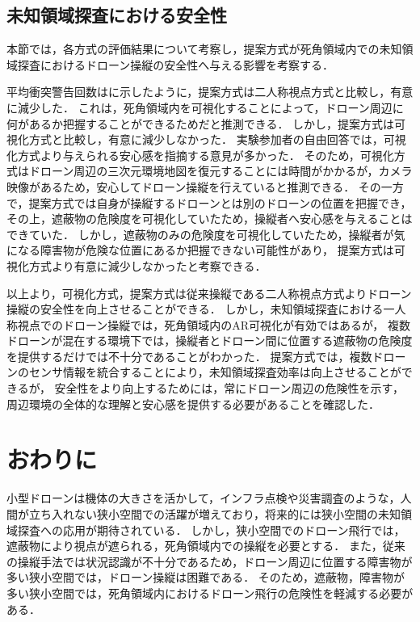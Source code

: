 \documentclass[a4paper,11pt]{ujreport}
\begin{document}
\section{未知領域探査における安全性}
\label{sec:Safety}

本節では，各方式の評価結果について考察し，提案方式が死角領域内での未知領域探査におけるドローン操縦の安全性へ与える影響を考察する．
\par
平均衝突警告回数はに示したように，提案方式は二人称視点方式と比較し，有意に減少した．
これは，死角領域内を可視化することによって，ドローン周辺に何があるか把握することができるためだと推測できる．
しかし，提案方式は可視化方式と比較し，有意に減少しなかった．
実験参加者の自由回答では，可視化方式より与えられる安心感を指摘する意見が多かった．
そのため，可視化方式はドローン周辺の三次元環境地図を復元することには時間がかかるが，カメラ映像があるため，安心してドローン操縦を行えていると推測できる．
その一方で，提案方式では自身が操縦するドローンとは別のドローンの位置を把握でき，その上，遮蔽物の危険度を可視化していたため，操縦者へ安心感を与えることはできていた．
しかし，遮蔽物のみの危険度を可視化していたため，操縦者が気になる障害物が危険な位置にあるか把握できない可能性があり，
提案方式は可視化方式より有意に減少しなかったと考察できる．

以上より，可視化方式，提案方式は従来操縦である二人称視点方式よりドローン操縦の安全性を向上させることができる．
しかし，未知領域探査における一人称視点でのドローン操縦では，死角領域内のAR可視化が有効ではあるが，
複数ドローンが混在する環境下では，操縦者とドローン間に位置する遮蔽物の危険度を提供するだけでは不十分であることがわかった．
提案方式では，複数ドローンのセンサ情報を統合することにより，未知領域探査効率は向上させることができるが，
安全性をより向上するためには，常にドローン周辺の危険性を示す，周辺環境の全体的な理解と安心感を提供する必要があることを確認した．





\chapter{おわりに}
\label{chap:Conclusion}

小型ドローンは機体の大きさを活かして，インフラ点検や災害調査のような，人間が立ち入れない狭小空間での活躍が増えており，将来的には狭小空間の未知領域探査への応用が期待されている．
しかし，狭小空間でのドローン飛行では，遮蔽物により視点が遮られる，死角領域内での操縦を必要とする．
また，従来の操縦手法では状況認識が不十分であるため，ドローン周辺に位置する障害物が多い狭小空間では，ドローン操縦は困難である．
そのため，遮蔽物，障害物が多い狭小空間では，死角領域内におけるドローン飛行の危険性を軽減する必要がある．
\end{document}
